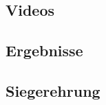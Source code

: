 \documentclass[a4paper, oneside,openany, 12pt, ngerman, listof=nochaptergap, bibliography=totoc,
,listof=totoc,listof=entryprefix,]{scrbook} %
\begin{document}
\setlength{\parindent}{0em} 


\begin{titlepage}

\end{titlepage}

\tableofcontents

\cleardoublepage


\newpage


\mainmatter














\begin{appendices}
\chapter{Videos}
\section{Ergebnisse}
\section{Siegerehrung}
\end{appendices}

\backmatter








%
\end{document}

